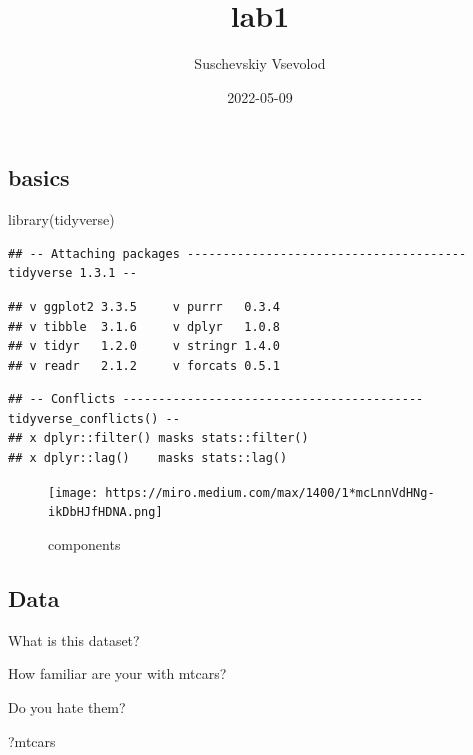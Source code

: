 \documentclass[
]{article}
\title{lab1}
\author{Suschevskiy Vsevolod}
\date{2022-05-09}
\newenvironment{Shaded}{\begin{snugshade}}{\end{snugshade}}
\newcommand{\FunctionTok}[1]{\textcolor[rgb]{0.00,0.00,0.00}{#1}}
\newcommand{\NormalTok}[1]{#1}
\begin{document}
\maketitle

\hypertarget{basics}{%
\subsection{basics}\label{basics}}

\begin{Shaded}
\begin{Highlighting}[]
\FunctionTok{library}\NormalTok{(tidyverse)}
\end{Highlighting}
\end{Shaded}

\begin{verbatim}
## -- Attaching packages --------------------------------------- tidyverse 1.3.1 --
\end{verbatim}

\begin{verbatim}
## v ggplot2 3.3.5     v purrr   0.3.4
## v tibble  3.1.6     v dplyr   1.0.8
## v tidyr   1.2.0     v stringr 1.4.0
## v readr   2.1.2     v forcats 0.5.1
\end{verbatim}

\begin{verbatim}
## -- Conflicts ------------------------------------------ tidyverse_conflicts() --
## x dplyr::filter() masks stats::filter()
## x dplyr::lag()    masks stats::lag()
\end{verbatim}

\begin{figure}
\centering
\texttt{[image: https://miro.medium.com/max/1400/1*mcLnnVdHNg-ikDbHJfHDNA.png]}
\caption{components}
\end{figure}

\hypertarget{data}{%
\subsection{Data}\label{data}}

What is this dataset?

How familiar are your with mtcars?

Do you hate them?

\begin{Shaded}
\begin{Highlighting}[]
\NormalTok{?mtcars}
\end{Highlighting}
\end{Shaded}
\end{document}
